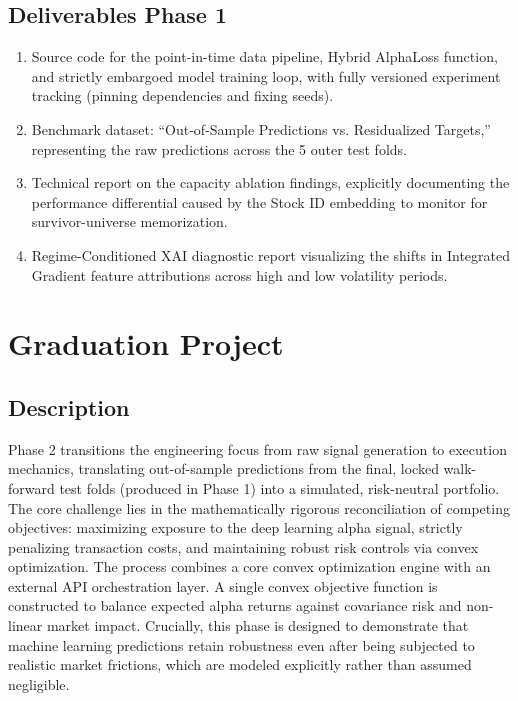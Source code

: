 \subsection*{Deliverables Phase 1}
\begin{enumerate}
    \item Source code for the point-in-time data pipeline, Hybrid AlphaLoss function, and strictly embargoed model training loop, with fully versioned experiment tracking (pinning dependencies and fixing seeds).
    \item Benchmark dataset: ``Out-of-Sample Predictions vs. Residualized Targets,'' representing the raw predictions across the 5 outer test folds.
    \item Technical report on the capacity ablation findings, explicitly documenting the performance differential caused by the Stock ID embedding to monitor for survivor-universe memorization.
    \item Regime-Conditioned \acs{XAI} diagnostic report visualizing the shifts in Integrated Gradient feature attributions across high and low volatility periods.
\end{enumerate}

\section{Graduation Project}
\subsection*{Description}
Phase 2 transitions the engineering focus from raw signal generation to execution mechanics, translating out-of-sample predictions from the final, locked walk-forward test folds (produced in Phase 1) into a simulated, risk-neutral portfolio. The core challenge lies in the mathematically rigorous reconciliation of competing objectives: maximizing exposure to the deep learning alpha signal, strictly penalizing transaction costs, and maintaining robust risk controls via convex optimization. The process combines a core convex optimization engine with an external \acs{API} orchestration layer. A single convex objective function is constructed to balance expected alpha returns against covariance risk and non-linear market impact. Crucially, this phase is designed to demonstrate that machine learning predictions retain robustness even after being subjected to realistic market frictions, which are modeled explicitly rather than assumed negligible.

